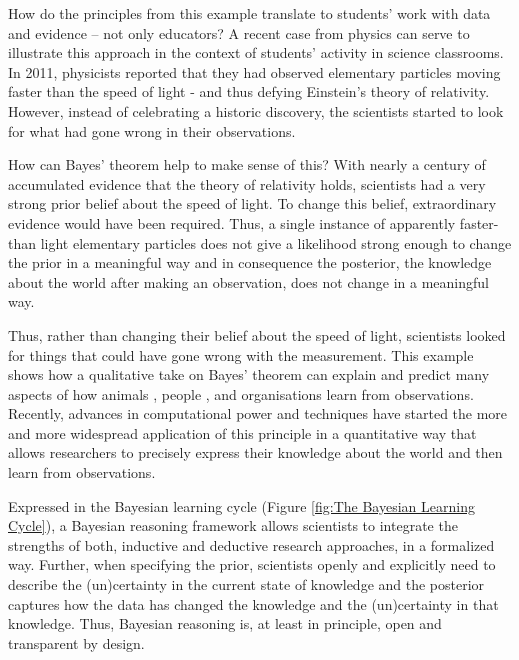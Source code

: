 \documentclass[man]{apa7}
\begin{document}
How do the principles from this example translate to students' work with data and evidence -- not only educators? A recent case from physics can serve to illustrate this approach in the context of students' activity in science classrooms. In 2011, physicists reported that they had observed elementary particles moving faster than the speed of light \parencite{b11} - and thus defying Einstein’s theory of relativity. However, instead of celebrating a historic discovery, the scientists started to look for what had gone wrong in their observations. 

How can Bayes’ theorem help to make sense of this? With nearly a century of accumulated evidence that the theory of relativity holds, scientists had a very strong prior belief about the speed of light. To change this belief, extraordinary evidence would have been required. Thus, a single instance of apparently faster-than light elementary particles does not give a likelihood strong enough to change the prior in a meaningful way and in consequence the posterior, the knowledge about the world after making an observation, does not change in a meaningful way. 

Thus, rather than changing their belief about the speed of light, scientists looked for things that could have gone wrong with the measurement. This example shows how a qualitative take on Bayes’ theorem can explain and predict many aspects of how animals \parencite{o13}, people \parencite{tgk06}, and organisations \parencite{kaj12} learn from observations. Recently, advances in computational power and techniques have started the more and more widespread application of this principle in a quantitative way that allows researchers to precisely express their knowledge about the world and then learn from observations. 

Expressed in the Bayesian learning cycle (Figure \ref{fig:The Bayesian Learning Cycle}), a Bayesian reasoning framework allows scientists to integrate the strengths of both, inductive and deductive research approaches, in a formalized way. Further, when specifying the prior, scientists openly and explicitly need to describe the (un)certainty in the current state of knowledge and the posterior captures how the data has changed the knowledge and the (un)certainty in that knowledge. Thus, Bayesian reasoning is, at least in principle, open and transparent by design.
\end{document}

